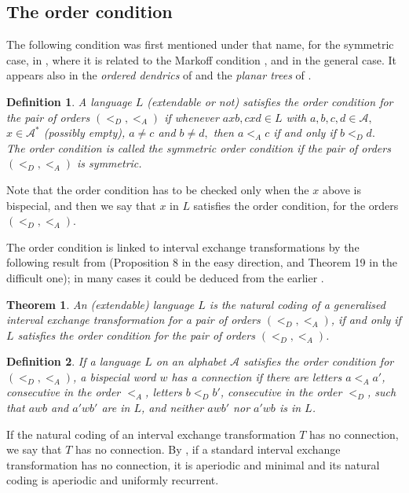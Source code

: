 \documentclass[12pt,a4paper]{amsart}
\newtheorem{theorem}{Theorem}
\newtheorem{definition}{Definition}
\begin{document}
\subsection{The order condition}
The following condition was first mentioned under that name, for the symmetric case, in \cite{zdl}, where it is related to the Markoff condition \cite{mar}, and \cite{fhuz} in the general case.  It appears also in the {\em ordered dendrics} of \cite{d} and the {\it planar trees} of \cite{b+}.

 \begin{definition}\label{dfordc}
  A language $L$ (extendable or not) satisfies  the {\em order condition} for the pair of orders $(<_D,<_A)$ if whenever $axb, cxd \in L$ with $a, b,c,d \in \mathcal A,$  $x\in \mathcal A^*$ (possibly empty),  $a\neq c$ and $b\neq d,$ then $a<_A c$ if and only if $b<_D d.$ \\   
The order condition is called the  {\it symmetric order condition} if the  pair of orders $(<_D,<_A)$ is symmetric. \end{definition} 
 
 Note that the order condition has to be checked only when the $x$ above  is bispecial, and then we say that $x$ in $L$ satisfies the order condition, for the orders $(<_D,<_A)$.

The order condition is linked to  interval exchange transformations by the following result from \cite{fhuz} (Proposition 8 in the easy direction, and Theorem 19 in the difficult one); in many cases it could be deduced from the earlier \cite{bel}.

\begin{theorem}\label{t0}\cite{fhuz} {\em An (extendable) language  $L$ is the natural coding of a  generalised interval exchange transformation for a  pair of orders $(<_D,<_A)$, if and only if $L$ satisfies the order condition for the pair of orders $(<_D,<_A)$.} \end{theorem}

   \begin{definition}\label{con}
If a language $L$ on an alphabet $\mathcal A$ satisfies the order condition for $(<_D,<_A)$, a bispecial word $w$ has a {\em connection} if there are letters $a<_{A}a'$, consecutive in the order $<_{A}$, letters $b<_{D}b'$, consecutive in the order $<_{D}$, such 
that $awb$ and  $a'wb'$ are in $L$, and neither $awb'$ nor $a'wb$ is in $L$.
  \end{definition}
  
If the natural coding of an  interval exchange transformation $T$ has no connection, we say that $T$ has no connection.  By \cite{kea}, if a standard  interval exchange transformation has no connection, it is aperiodic and  minimal and its natural coding  is aperiodic and uniformly recurrent. 
\end{document}
